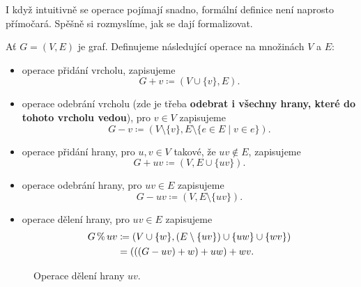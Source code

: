 I když intuitivně se operace pojímají snadno, formální definice není naprosto
přímočará. Spěšně si rozmyslíme, jak se dají formalizovat.

\begin{definition}
 \label{def:zakladni-grafove-operace}
 Ať $G = (V,E)$ je graf. Definujeme následující operace na množinách $V$ a $E$:
 \begin{itemize}
  \item operace přidání vrcholu, zapisujeme
   \[
    G + v \coloneqq (V \cup \{v\}, E).
   \]
  \item operace odebrání vrcholu (zde je třeba \textbf{odebrat i všechny hrany,
   které do tohoto vrcholu vedou}), pro $v \in V$ zapisujeme
   \[
    G - v \coloneqq (V \setminus \{v\}, E \setminus \{e \in E \mid v \in e\}).
   \]
  \item operace přidání hrany, pro $u,v \in V$ takové, že $uv \notin E$,
   zapisujeme
   \[
    G + uv \coloneqq (V, E \cup \{uv\}).
   \]
  \item operace odebrání hrany, pro $uv \in E$ zapisujeme
   \[
    G - uv \coloneqq (V, E \setminus \{uv\}).
   \]
  \item operace dělení hrany, pro $uv \in E$ zapisujeme
   \begin{equation*}
    \begin{split} 
     G \operatorname{\%} uv &\coloneqq (V \cup \{w\}, (E \setminus \{uv\}) \cup \{uw\} \cup
     \{wv\})\\
              &= (((G - uv) + w) + uw) + wv.
    \end{split}
   \end{equation*}
 \end{itemize}
\end{definition}

\begin{figure}[h]
 \centering

 \caption{Operace dělení hrany $uv$.}
 \label{fig:deleni-hrany}
\end{figure}

